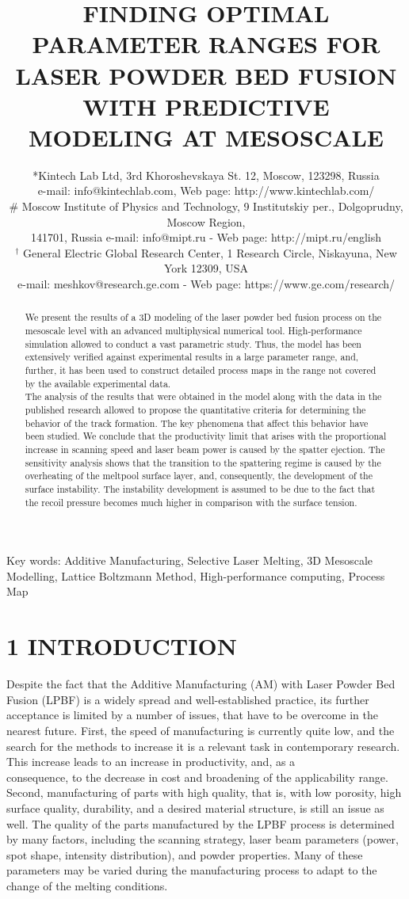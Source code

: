 \documentclass[10pt]{article}
\title{FINDING OPTIMAL PARAMETER RANGES FOR LASER POWDER BED FUSION WITH PREDICTIVE MODELING AT MESOSCALE }
\author{*Kintech Lab Ltd, 3rd Khoroshevskaya St. 12, Moscow, 123298, Russia\\
e-mail: info@kintechlab.com, Web page: http://www.kintechlab.com/\\
\# Moscow Institute of Physics and Technology, 9 Institutskiy per., Dolgoprudny, Moscow Region,\\
141701, Russia e-mail: info@mipt.ru - Web page: http://mipt.ru/english\\
${ }^{\dagger}$ General Electric Global Research Center, 1 Research Circle, Niskayuna, New York 12309, USA\\
e-mail: meshkov@research.ge.com - Web page: https://www.ge.com/research/}
\date{}
\begin{document}
\maketitle
Key words: Additive Manufacturing, Selective Laser Melting, 3D Mesoscale Modelling, Lattice Boltzmann Method, High-performance computing, Process Map

\begin{abstract}
We present the results of a 3D modeling of the laser powder bed fusion process on the mesoscale level with an advanced multiphysical numerical tool. High-performance simulation allowed to conduct a vast parametric study. Thus, the model has been extensively verified against experimental results in a large parameter range, and, further, it has been used to construct detailed process maps in the range not covered by the available experimental data.\\
The analysis of the results that were obtained in the model along with the data in the published research allowed to propose the quantitative criteria for determining the behavior of the track formation. The key phenomena that affect this behavior have been studied. We conclude that the productivity limit that arises with the proportional increase in scanning speed and laser beam power is caused by the spatter ejection. The sensitivity analysis shows that the transition to the spattering regime is caused by the overheating of the meltpool surface layer, and, consequently, the development of the surface instability. The instability development is assumed to be due to the fact that the recoil pressure becomes much higher in comparison with the surface tension.
\end{abstract}

\section*{1 INTRODUCTION}
Despite the fact that the Additive Manufacturing (AM) with Laser Powder Bed Fusion (LPBF) is a widely spread and well-established practice, its further acceptance is limited by a number of issues, that have to be overcome in the nearest future. First, the speed of manufacturing is currently quite low, and the search for the methods to increase it is a relevant task in contemporary research. This increase leads to an increase in productivity, and, as a\\
consequence, to the decrease in cost and broadening of the applicability range. Second, manufacturing of parts with high quality, that is, with low porosity, high surface quality, durability, and a desired material structure, is still an issue as well. The quality of the parts manufactured by the LPBF process is determined by many factors, including the scanning strategy, laser beam parameters (power, spot shape, intensity distribution), and powder properties. Many of these parameters may be varied during the manufacturing process to adapt to the change of the melting conditions.
\end{document}
